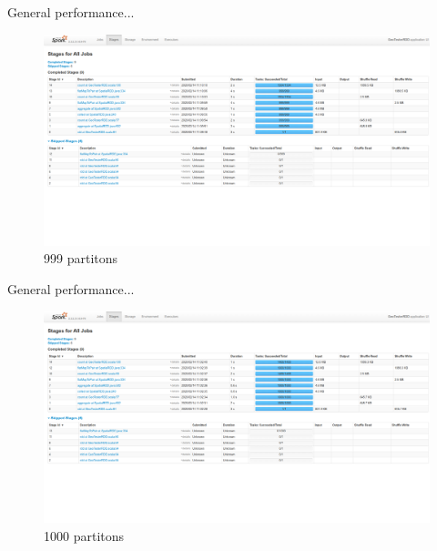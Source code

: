 \documentclass{beamer}
\begin{document}
\begin{frame}{General performance...}
    \begin{figure}
        \includegraphics[width=\textwidth]{figures/P999}
        \caption{999 partitons}
    \end{figure}
\end{frame}
\begin{frame}{General performance...}
    \begin{figure}
        \includegraphics[width=\textwidth]{figures/P1000}
        \caption{1000 partitons}
    \end{figure}
\end{frame}
\end{document}
